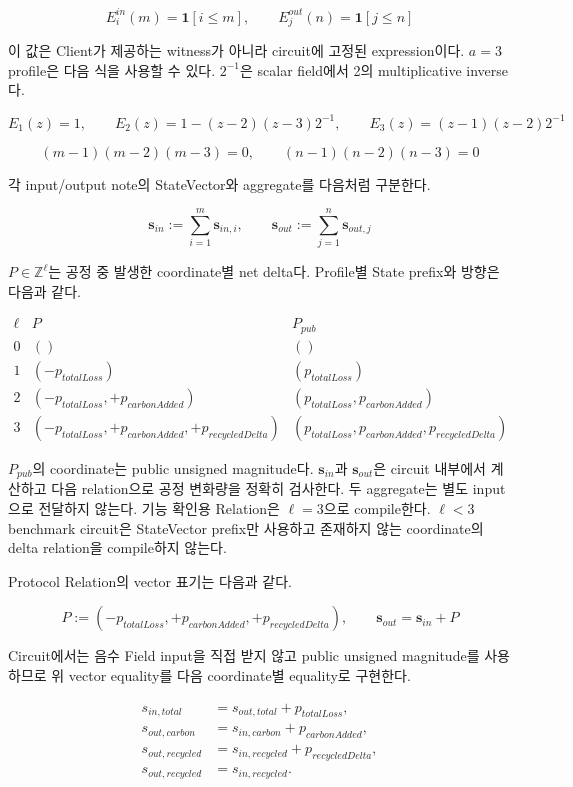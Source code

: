 \documentclass[11pt,a4paper]{extarticle}
\begin{document}
\[
E^{in}_i(m)=\mathbf{1}[i\leq m],
\qquad
E^{out}_j(n)=\mathbf{1}[j\leq n]
\]

이 값은 Client가 제공하는 witness가 아니라 circuit에 고정된 expression이다. $a=3$ profile은
다음 식을 사용할 수 있다. $2^{-1}$은 scalar field에서 2의 multiplicative inverse다.

\[
E_1(z)=1,
\qquad
E_2(z)=1-(z-2)(z-3)2^{-1},
\qquad
E_3(z)=(z-1)(z-2)2^{-1}
\]

\[
(m-1)(m-2)(m-3)=0,
\qquad
(n-1)(n-2)(n-3)=0
\]

각 input/output note의 StateVector와 aggregate를 다음처럼 구분한다.

\[
\mathbf{s}_{in}:=\sum_{i=1}^{m}\mathbf{s}_{in,i},
\qquad
\mathbf{s}_{out}:=\sum_{j=1}^{n}\mathbf{s}_{out,j}
\]

$P\in\mathbb{Z}^{\ell}$는 공정 중 발생한 coordinate별 net delta다. Profile별 State
prefix와 방향은 다음과 같다.

\[
\begin{array}{c|c|c}
\ell & P & P_{pub} \\
\hline
0 & () & () \\
1 & (-p_{totalLoss}) & (p_{totalLoss}) \\
2 & (-p_{totalLoss},+p_{carbonAdded}) & (p_{totalLoss},p_{carbonAdded}) \\
3 & (-p_{totalLoss},+p_{carbonAdded},+p_{recycledDelta}) &
(p_{totalLoss},p_{carbonAdded},p_{recycledDelta})
\end{array}
\]

$P_{pub}$의 coordinate는 public unsigned magnitude다. $\mathbf{s}_{in}$과
$\mathbf{s}_{out}$은 circuit 내부에서 계산하고 다음 relation으로 공정 변화량을
정확히 검사한다. 두 aggregate는 별도 input으로 전달하지 않는다. 기능 확인용 Relation은
$\ell=3$으로 compile한다. $\ell<3$ benchmark circuit은 StateVector prefix만 사용하고
존재하지 않는 coordinate의 delta relation을 compile하지 않는다.

Protocol Relation의 vector 표기는 다음과 같다.

\[
P:=(-p_{totalLoss},+p_{carbonAdded},+p_{recycledDelta}),
\qquad
\mathbf{s}_{out}=\mathbf{s}_{in}+P
\]

Circuit에서는 음수 Field input을 직접 받지 않고 public unsigned magnitude를 사용하므로
위 vector equality를 다음 coordinate별 equality로 구현한다.

\[
\begin{aligned}
s_{in,total}&=s_{out,total}+p_{totalLoss},\\
s_{out,carbon}&=s_{in,carbon}+p_{carbonAdded},\\
s_{out,recycled}&=s_{in,recycled}+p_{recycledDelta},\\
s_{out,recycled}&=s_{in,recycled}.
\end{aligned}
\]
\end{document}
